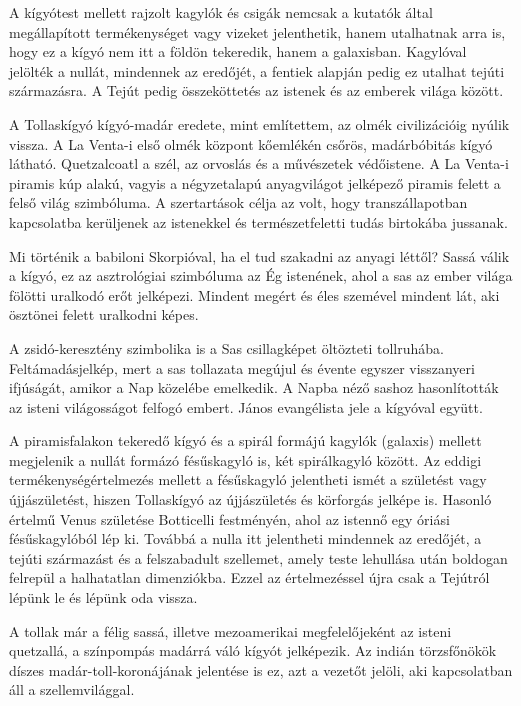 A kígyótest mellett rajzolt kagylók és csigák nemcsak a kutatók
által megállapított termékenységet vagy vizeket jelenthetik, hanem
utalhatnak arra is, hogy ez a kígyó nem itt a földön tekeredik, hanem
a galaxisban. Kagylóval jelölték a nullát, mindennek az eredőjét,
a fentiek alapján pedig ez utalhat tejúti származásra. A Tejút pedig
összeköttetés az istenek és az emberek világa között.

A Tollaskígyó kígyó-madár eredete, mint említettem, az olmék civilizációig
nyúlik vissza. A La Venta-i első olmék központ kőemlékén
csőrös, madárbóbitás kígyó látható. Quetzalcoatl a szél, az orvoslás
és a művészetek védőistene. A La Venta-i piramis kúp alakú, vagyis
a négyzetalapú anyagvilágot jelképező piramis felett a felső világ
szimbóluma. A szertartások célja az volt, hogy transzállapotban kapcsolatba
kerüljenek az istenekkel és természetfeletti tudás birtokába
jussanak.

Mi történik a babiloni Skorpióval, ha el tud szakadni az anyagi léttől?
Sassá válik a kígyó, ez az asztrológiai szimbóluma az Ég
istenének, ahol a sas az ember világa fölötti uralkodó erőt jelképezi.
Mindent megért és éles szemével mindent lát, aki ösztönei felett
uralkodni képes.

A zsidó-keresztény szimbolika is a Sas csillagképet öltözteti tollruhába.
Feltámadásjelkép, mert a sas tollazata megújul és évente egyszer
visszanyeri ifjúságát, amikor a Nap közelébe emelkedik. A Napba
néző sashoz hasonlították az isteni világosságot felfogó embert. János
evangélista jele a kígyóval együtt.

A piramisfalakon tekeredő kígyó és a spirál formájú kagylók (galaxis)
mellett megjelenik a nullát formázó fésűskagyló is, két spirálkagyló
között. Az eddigi termékenységértelmezés mellett a fésűskagyló
jelentheti ismét a születést vagy újjászületést, hiszen Tollaskígyó az
újjászületés és körforgás jelképe is. Hasonló értelmű Venus születése
Botticelli festményén, ahol az istennő egy óriási fésűskagylóból lép ki.
Továbbá a nulla itt jelentheti mindennek az eredőjét, a tejúti származást
és a felszabadult szellemet, amely teste lehullása után boldogan
felrepül a halhatatlan dimenziókba. Ezzel az értelmezéssel újra csak a
Tejútról lépünk le és lépünk oda vissza.

A tollak már a félig sassá, illetve mezoamerikai megfelelőjeként az
isteni quetzallá, a színpompás madárrá váló kígyót jelképezik. Az indián
törzsfőnökök díszes madár-toll-koronájának jelentése is ez, azt a
vezetőt jelöli, aki kapcsolatban áll a szellemvilággal.

